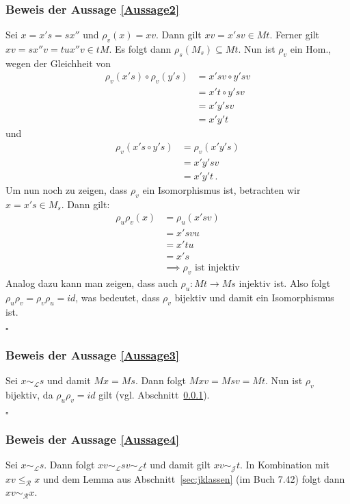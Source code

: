 \documentclass[12pt, german]{article}
\newcommand{\grel}{\sim_{\mathcal{L}}}
\newcommand{\grer}{\sim_{\mathcal{R}}}
\newcommand{\grej}{\sim_{\mathcal{J}}}
\newcommand{\lgrereq}{\leqslant_{\mathcal{R}}}
\newcommand{\bewiesen}{
	
	\begin{flushright}
		$\square$  \\
\end{flushright}}
\begin{document}
	\subsubsection{Beweis der Aussage \ref{Aussage2}}
	\label{sec:beweis_aussage_b}
	Sei $x = x's = sx''$ und $\rho_v(x) = xv$.
	Dann gilt $xv = x'sv \in Mt$. Ferner gilt $xv = sx''v = tux''v \in tM$. 
	Es folgt dann $\rho_s(M_s) \subseteq Mt$. 
	Nun ist $\rho_v$ ein Hom., wegen der Gleichheit von  
	\begin{align*}
		\rho_v(x's)\circ \rho_v(y's) &= x'sv \circ y'sv \\
		&= x't \circ y'sv\\ 
		&= x'y'sv \\
		&= x'y't
	\end{align*}
	und 
	\begin{align*}
		\rho_v(x's \circ y's) &= \rho_v(x'y's) \\
		&= x'y'sv \\
		&= x'y't\, .
	\end{align*}
	Um nun noch zu zeigen, dass $\rho_v$ ein Isomorphismus ist, betrachten wir $x = x's \in M_s$. Dann gilt: 
	\begin{align*}
		\rho_u\rho_v(x) &= \rho_u(x'sv) \\
		&= x'svu \\
		&= x'tu \\
		&=x's \\
		&\implies \rho_v \text{ ist injektiv}
	\end{align*}
	Analog dazu kann man zeigen, dass auch $\rho_u: Mt \to Ms$ injektiv ist. Also folgt $\rho_u\rho_v = \rho_v\rho_u = id$, was bedeutet, dass $\rho_v$ bijektiv und damit ein Isomorphismus ist.
	\bewiesen
	
	\subsubsection{Beweis der Aussage \ref{Aussage3}}
	Sei $x \grel s$ und damit $Mx = Ms$. Dann folgt $Mxv = Msv = Mt$. Nun ist $\rho_v$ bijektiv, da $\rho_u\rho_v = id$ gilt (vgl. Abschnitt~\ref{sec:beweis_aussage_b}).
	\bewiesen
	
	\subsubsection{Beweis der Aussage \ref{Aussage4}}
	Sei $x\grel s$. Dann folgt  $ xv \grel sv \grel t$ und damit gilt $xv \grej t$. In Kombination mit $xv \lgrereq x$ und dem Lemma aus Abschnitt~\ref{sec:jklassen} (im Buch 7.42) folgt dann $xv \grer x$. \\
	
\end{document}
